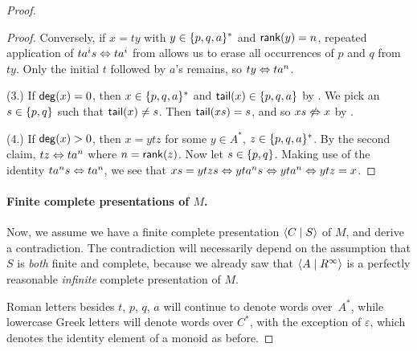\documentclass[../generics]{subfiles}
\begin{document}
\begin{proof}
\begin{proof}
Conversely, if $x=ty$ with $y \in \{p,q,a\}^*$ and $\mathsf{rank}(y)=n$, repeated application of $ta^is \Leftrightarrow ta^i$ from  allows us to erase all occurrences of $p$ and $q$ from $ty$. Only the initial $t$ followed by $a$'s remains, so $ty \Leftrightarrow ta^n$.

\smallskip

(3.) If $\mathsf{deg}(x) = 0$, then $x \in \{p,q,a\}^*$ and $\mathsf{tail}(x) \in \{p,q,a\}$ by . We pick an $s \in \{p,q\}$ such that $\mathsf{tail}(x) \neq s$. Then $\mathsf{tail}(xs) = s$, and so $xs \not\Leftrightarrow x$ by .

\smallskip

(4.) If $\mathsf{deg}(x) > 0$, then $x=ytz$ for some $y \in A^*$, $z \in \{p,q,a\}^*$. By the second claim, $tz \Leftrightarrow ta^n$ where $n=\mathsf{rank}(z)$. Now let $s \in \{p,q\}$. Making use of the identity $ta^ns \Leftrightarrow ta^n$, we see that $xs = ytzs \Leftrightarrow yta^ns \Leftrightarrow yta^n \Leftrightarrow ytz = x$.
\end{proof}

\paragraph{Finite complete presentations of $M$.}
Now, we assume we have a finite complete presentation $\langle C \mid S\rangle$ of $M$, and derive a contradiction. The contradiction will necessarily depend on the assumption that $S$ is \emph{both} finite and complete, because we already saw that $\langle A \mid R^\infty\rangle$ is a perfectly reasonable \emph{infinite} complete presentation of $M$.

Roman letters besides $t$, $p$, $q$, $a$ will continue to denote words over~$A^*$, while lowercase Greek letters will denote words over $C^*$, with the exception of $\varepsilon$, which denotes the identity element of a monoid as before.


\end{proof}
\end{document}
